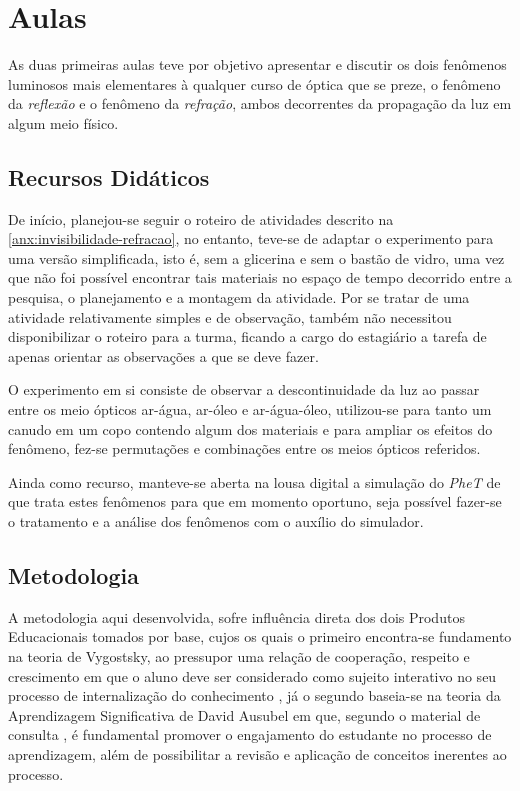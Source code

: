 \section{Aulas}

As duas primeiras aulas teve por objetivo apresentar e discutir os dois fenômenos luminosos mais elementares à qualquer curso de óptica que se preze, o fenômeno da \emph{reflexão} e o fenômeno da \emph{refração}, ambos  decorrentes da propagação da luz em algum meio físico.

\subsection{Recursos Didáticos}
De início, planejou-se seguir o roteiro de atividades descrito na \autoref{anx:invisibilidade-refracao}, no entanto, teve-se de adaptar o experimento para uma versão simplificada, isto é, sem a glicerina e sem o bastão de vidro, uma vez que não foi possível encontrar tais materiais no espaço de tempo decorrido entre a pesquisa, o planejamento e a montagem da atividade. Por se tratar de uma atividade relativamente simples e de observação, também não necessitou disponibilizar o roteiro para a turma, ficando a cargo do estagiário a tarefa de apenas orientar as observações a que se deve fazer.

O experimento em si consiste de observar a descontinuidade da luz ao passar entre os meio ópticos ar-água, ar-óleo e ar-água-óleo, utilizou-se para tanto um canudo em um copo contendo algum dos materiais e para ampliar os efeitos do fenômeno, fez-se permutações e combinações entre os meios ópticos referidos.

Ainda como recurso, manteve-se aberta na lousa digital a simulação do \emph{PheT} de que trata estes fenômenos para que em momento oportuno, seja possível fazer-se o tratamento e a análise dos fenômenos com o auxílio do simulador.

\subsection{Metodologia}
A metodologia aqui desenvolvida, sofre influência direta dos dois Produtos Educacionais tomados por base, cujos os quais o primeiro encontra-se fundamento na teoria de Vygostsky, ao pressupor uma relação de cooperação, respeito e crescimento em que o aluno deve ser considerado como sujeito interativo no seu processo de internalização do conhecimento \cite{JAQUELINE:2019}, já o segundo baseia-se na teoria da Aprendizagem Significativa de David Ausubel em que, segundo o material de consulta \cite{AGNALDO:2018}, é fundamental promover o engajamento do estudante no processo de aprendizagem, além de possibilitar a revisão e aplicação de conceitos inerentes ao processo.

